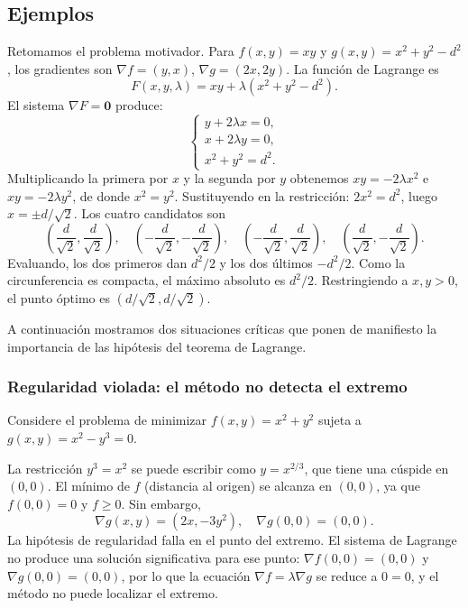 \subsection{Ejemplos}

\begin{example}
Retomamos el problema motivador. Para $f(x,y)=xy$ y $g(x,y)=x^2+y^2-d^2$, los gradientes son $\nabla f=(y,x)$, $\nabla g=(2x,2y)$. La función de Lagrange es
\[
F(x,y,\lambda)=xy+\lambda(x^2+y^2-d^2).
\]
El sistema $\nabla F=\mathbf{0}$ produce:
\[
\begin{cases}
y+2\lambda x=0,\\
x+2\lambda y=0,\\
x^2+y^2=d^2.
\end{cases}
\]
Multiplicando la primera por $x$ y la segunda por $y$ obtenemos $xy=-2\lambda x^2$ e $xy=-2\lambda y^2$, de donde $x^2=y^2$. Sustituyendo en la restricción: $2x^2=d^2$, luego $x=\pm d/\sqrt{2}$. Los cuatro candidatos son
\[
\left(\frac{d}{\sqrt2},\frac{d}{\sqrt2}\right),\quad
\left(-\frac{d}{\sqrt2},-\frac{d}{\sqrt2}\right),\quad
\left(-\frac{d}{\sqrt2},\frac{d}{\sqrt2}\right),\quad
\left(\frac{d}{\sqrt2},-\frac{d}{\sqrt2}\right).
\]
Evaluando, los dos primeros dan $d^2/2$ y los dos últimos $-d^2/2$. Como la circunferencia es compacta, el máximo absoluto es $d^2/2$. Restringiendo a $x,y>0$, el punto óptimo es $\left(d/\sqrt2,d/\sqrt2\right)$.
\end{example}

A continuación mostramos dos situaciones críticas que ponen de manifiesto la importancia de las hipótesis del teorema de Lagrange.

\subsubsection{Regularidad violada: el método no detecta el extremo}

\begin{example}[Cúspide]
Considere el problema de minimizar $f(x,y)=x^2+y^2$ sujeta a $g(x,y)=x^2-y^3=0$.
\end{example}

La restricción $y^3=x^2$ se puede escribir como $y=x^{2/3}$, que tiene una cúspide en $(0,0)$. El mínimo de $f$ (distancia al origen) se alcanza en $(0,0)$, ya que $f(0,0)=0$ y $f\ge0$. Sin embargo,
\[
\nabla g(x,y)=(2x,-3y^2),\quad \nabla g(0,0)=(0,0).
\]
La hipótesis de regularidad falla en el punto del extremo. El sistema de Lagrange no produce una solución significativa para ese punto: $\nabla f(0,0)=(0,0)$ y $\nabla g(0,0)=(0,0)$, por lo que la ecuación $\nabla f=\lambda\nabla g$ se reduce a $0=0$, y el método no puede localizar el extremo.

